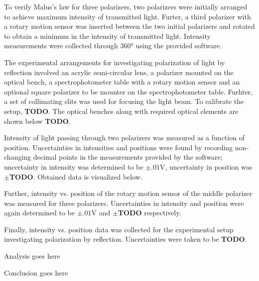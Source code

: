 \begin{paper}
	To verify Malus's law for three polarizers, two polarizers were initially arranged to achieve maximum intensity of transmitted light. Furter, a third polarizer with a rotary motion sensor was inserted between the two initial polarizers and rotated to obtain a minimum in the intensity of transmitted light. Intensity measurements were collected through \( 360 \si{\degree} \) using the provided software.
	
	The experimental arrangements for investigating polarization of light by reflection involved an acrylic semi-circular lens, a polarizer mounted on the optical bench, a spectrophotometer table with a rotary motion sensor and an optional square polarizer to be mounter on the spectrophotometer table. Furhter, a set of collimating slits was used for focusing the light beam. To calibrate the setup, \textbf{TODO}. The optical benches along with required optical elements are shown below \textbf{TODO}.
	
	
	Intensity of light passing through two polarizers was measured as a function of position. Uncertainties in intensities and positions were found by recording non-changing decimal points in the measurements provided by the software; uncertainty in intensity was determined to be \( \pm .01 \si{\volt} \), uncertainty in position was \( \pm \)\textbf{TODO}. Obtained data is visualized below.
		
	Further, intensity vs. position of the rotary motion sensor of the middle polarizer was measured for three polarizers. Uncertainties in intensity and position were again determined to be \( \pm .01 \si{\volt} \) and \( \pm \)\textbf{TODO} respectively.
	
	Finally, intensity vs. position data was collected for the experimental setup investigating polarization by reflection. Uncertainties were taken to be \textbf{TODO}. 
	
	
	Analysis goes here
	

	Conclusion goes here



\end{paper}

